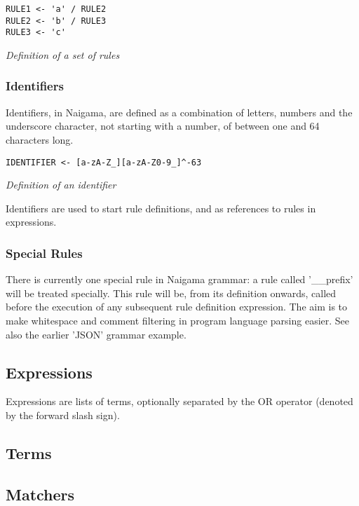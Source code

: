 \begin{myquote}
\begin{verbatim}
RULE1 <- 'a' / RULE2
RULE2 <- 'b' / RULE3
RULE3 <- 'c'

\end{verbatim}
\end{myquote}
\textit{Definition of a set of rules}

\subsubsection{Identifiers}

Identifiers, in Naigama, are defined as a combination of letters,
numbers and the underscore character, not starting with a number,
of between one and 64 characters long.

\begin{myquote}
\begin{verbatim}
IDENTIFIER <- [a-zA-Z_][a-zA-Z0-9_]^-63

\end{verbatim}
\end{myquote}
\textit{Definition of an identifier}

Identifiers are used to start rule definitions, and as references
to rules in expressions.

\subsubsection{Special Rules}

There is currently one special rule in Naigama grammar: a rule called
'\_\_prefix' will be treated specially. This rule will be, from its
definition onwards, called before the execution of any subsequent rule
definition expression. The aim is to make whitespace and comment filtering
in program language parsing easier. See also the earlier 'JSON' grammar
example.

\subsection{Expressions}

Expressions are lists of terms, optionally separated by the
OR operator (denoted by the forward slash sign).

\subsection{Terms}

\subsection{Matchers}

